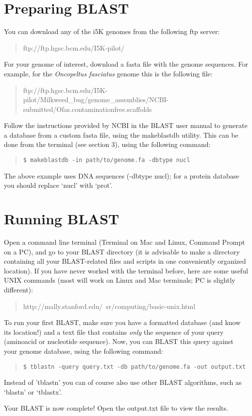 \documentclass[12pt]{article}
\begin{document}
\section{Preparing BLAST}
You can download any of the i5K genomes from the following ftp server:
\begin{quote}
ftp://ftp.hgsc.bcm.edu/I5K-pilot/
\end{quote}
For your genome of interest, download a fasta file with the genome sequences. For example, for the \textit{Oncopeltus fasciatus} genome this is the following file:
\begin{quote}{ftp://ftp.hgsc.bcm.edu/I5K-pilot/Milkweed\_bug/genome\_assemblies/NCBI-submitted/Ofas.contaminationfree.scaffolds}
\end{quote}
Follow the instructions provided by NCBI in the BLAST user manual to generate a database from a custom fasta file, using the makeblastdb utility. This can be done from the terminal (see section 3), using the following command:
\begin{quote}
\begin{verbatim}
$ makeblastdb -in path/to/genome.fa -dbtype nucl
\end{verbatim}
\end{quote}
The above example uses DNA sequences (-dbtype nucl); for a protein database you should replace `nucl' with `prot'.
\section{Running BLAST}
Open a command line terminal (Terminal on Mac and Linux, Command Prompt on a PC), and go to your BLAST directory (it is advisable to make a directory containing all your BLAST-related files and scripts in one conveniently organized location). If you have never worked with the terminal before, here are some useful UNIX commands (most will work on Linux and Mac terminals; PC is slightly different):
\begin{quote}
http://mally.stanford.edu/~sr/computing/basic-unix.html
\end{quote}
To run your first BLAST, make sure you have a formatted database (and know its location!) and a text file that contains \textit{only} the sequence of your query (aminoacid or nucleotide sequence). Now, you can BLAST this query against your genome database, using the following command:
\begin{quote}
\begin{verbatim}
$ tblastn -query query.txt -db path/to/genome.fa -out output.txt
\end{verbatim}
\end{quote}
Instead of 'tblastn' you can of course also use other BLAST algorithms, such as `blastn' or `tblastx'.\par
Your BLAST is now complete! Open the output.txt file to view the results.
\end{document}
